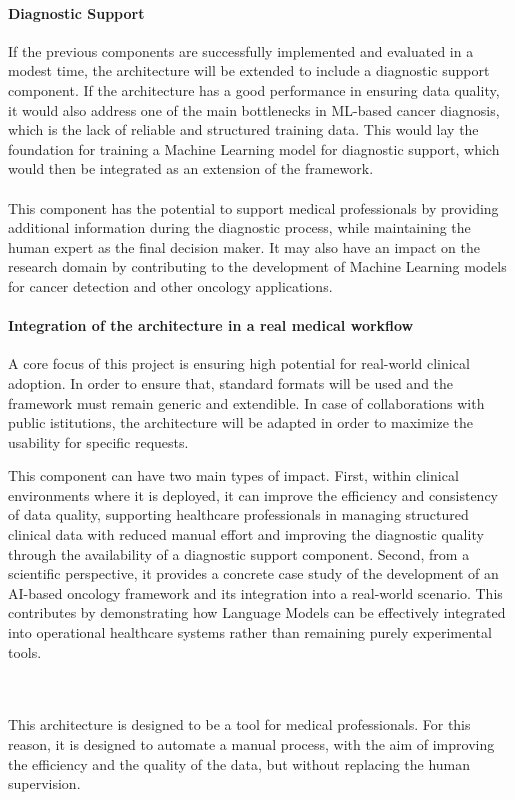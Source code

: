 \documentclass{scrartcl}
\begin{document}
\paragraph{Diagnostic Support}{If the previous components are successfully implemented and evaluated in a modest time, the architecture will be extended to include a diagnostic support component.
If the architecture has a good performance in ensuring data quality, it would also address one of the main bottlenecks in ML-based cancer diagnosis, which is the lack of reliable and structured training data. This would lay the foundation for training a Machine Learning model for diagnostic support, which would then be integrated as an extension of the framework.
\\\\
This component has the potential to support medical professionals by providing additional information during the diagnostic process, while maintaining the human expert as the final decision maker. It may also have an impact on the research domain by contributing to the development of Machine Learning models for cancer detection and other oncology applications.
}
\paragraph{Integration of the architecture in a real medical workflow}{A core focus of this project is ensuring high potential for real-world clinical adoption. In order to ensure that, standard formats will be used and the framework must remain generic and extendible.
In case of collaborations with public istitutions, the architecture will be adapted in order to maximize the usability for specific requests.

This component can have two main types of impact. First, within clinical environments where it is deployed, it can improve the efficiency and consistency of data quality, supporting healthcare professionals in managing structured clinical data with reduced manual effort and improving the diagnostic quality through the availability of a diagnostic support component.
Second, from a scientific perspective, it provides a concrete case study of the development of an AI-based oncology framework and its integration into a real-world scenario. This contributes by demonstrating how Language Models can be effectively integrated into operational healthcare systems rather than remaining purely experimental tools.
}
\\\\
This architecture is designed to be a tool for medical professionals. For this reason, it is designed to automate a manual process, with the aim of improving the efficiency and the quality of the data, but without replacing the human supervision. 
\end{document}

